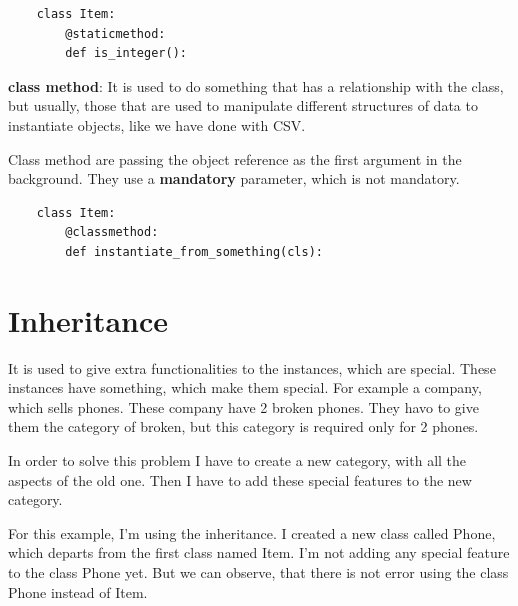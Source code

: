 \documentclass{article}
\begin{document}
\begin{lstlisting}
	class Item:
		@staticmethod:
		def is_integer():
\end{lstlisting}

\textbf{class method}: It is used to do something that has a relationship with the class, but usually, those that are used to manipulate different structures of data to instantiate objects, like we have done with CSV.

Class method are passing the object reference as the first argument in the background. They use a \textbf{mandatory} parameter, which is not mandatory.

\begin{lstlisting}
	class Item:
		@classmethod:
		def instantiate_from_something(cls):
\end{lstlisting}

\section{Inheritance}

It is used to give extra functionalities to the instances, which are special.
These instances have something, which make them special. For example a company, which sells phones. These company have 2 broken phones. They havo to give them the category of broken, but this category is required only for 2 phones.

In order to solve this problem I have to create a new category, with all the aspects of the old one. Then I have to add these special features to the new category. 

For this example, I'm using the inheritance. I created a new class called Phone, which departs from the first class named Item. I'm not adding any special feature to the class Phone yet. But we can observe, that there is not error using the class Phone instead of Item.
\end{document}
